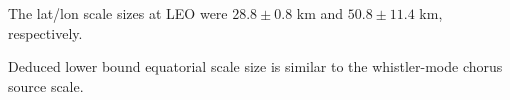 \documentclass[draft, linenumbers]{agujournal}
\begin{document}






\begin{keypoints}
\item The  lat/lon scale sizes  at LEO were $28.8 \pm 0.8$ km and $50.8 \pm 11.4$ km, respectively.
\item Deduced lower bound equatorial scale size is similar to the whistler-mode chorus source scale.
\end{keypoints}

%
%

\end{document}
